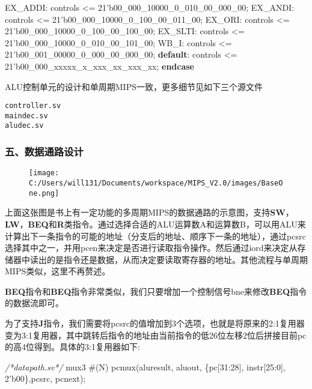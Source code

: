 \documentclass[]{article}
\newenvironment{Shaded}{}{}
\newcommand{\KeywordTok}[1]{\textcolor[rgb]{0.00,0.44,0.13}{\textbf{#1}}}
\newcommand{\DecValTok}[1]{\textcolor[rgb]{0.25,0.63,0.44}{#1}}
\newcommand{\BaseNTok}[1]{\textcolor[rgb]{0.25,0.63,0.44}{#1}}
\newcommand{\CommentTok}[1]{\textcolor[rgb]{0.38,0.63,0.69}{\textit{#1}}}
\newcommand{\NormalTok}[1]{#1}
\begin{document}
\begin{Shaded}
\begin{Highlighting}[]
            \DecValTok{EX_ADDI:}\NormalTok{    controls <= }\BaseNTok{21'b00_000_10000_0_010_00_000_00}\NormalTok{;}
            \DecValTok{EX_ANDI:}\NormalTok{    controls <= }\BaseNTok{21'b00_000_10000_0_100_00_011_00}\NormalTok{; }
            \DecValTok{EX_ORI:}\NormalTok{     controls <= }\BaseNTok{21'b00_000_10000_0_100_00_100_00}\NormalTok{; }
            \DecValTok{EX_SLTI:}\NormalTok{    controls <= }\BaseNTok{21'b00_000_10000_0_010_00_101_00}\NormalTok{; }
            \DecValTok{WB_I:}\NormalTok{       controls <= }\BaseNTok{21'b00_001_00000_0_000_00_000_00}\NormalTok{;}
            \KeywordTok{default}\NormalTok{:    controls <= }\BaseNTok{21'b00_000_xxxxx_x_xxx_xx_xxx_xx}\NormalTok{;}
        \KeywordTok{endcase}
\end{Highlighting}
\end{Shaded}

ALU控制单元的设计和单周期MIPS一致，更多细节见如下三个源文件

\begin{verbatim}
controller.sv 
maindec.sv
aludec.sv
\end{verbatim}

\subsubsection{五、数据通路设计}\label{header-n1972}

\begin{figure}
\centering
\texttt{[image: C:/Users/will131/Documents/workspace/MIPS\_V2.0/images/BaseOne.png]}
\caption{}
\end{figure}

上面这张图是书上有一定功能的多周期MIPS的数据通路的示意图，支持\textbf{SW}，\textbf{LW}，\textbf{BEQ}和\textbf{R}类指令。通过选择合适的ALU运算数A和运算数B，可以用ALU来计算出下一条指令的可能的地址（分支后的地址、顺序下一条的地址），通过pcsrc选择其中之一，并用pcen来决定是否进行读取指令操作。然后通过iord来决定从存储器中读出的是指令还是数据，从而决定要读取寄存器的地址。其他流程与单周期MIPS类似，这里不再赘述。

\textbf{BEQ}指令和\textbf{BEQ}指令非常类似，我们只要增加一个控制信号bne来修改\textbf{BEQ}指令的数据流即可。

为了支持\textbf{J}指令，我们需要将pcsrc的值增加到3个选项，也就是将原来的2:1复用器变为3:1复用器，其中跳转后指令的地址由当前指令的低26位左移2位后拼接目前pc的高4位得到。具体的3:1复用器如下:

\begin{Shaded}
\begin{Highlighting}[]
\CommentTok{/*datapath.sv*/}
\NormalTok{mux3 #(N)       pcmux(aluresult, aluout, \{pc[}\DecValTok{31}\NormalTok{:}\DecValTok{28}\NormalTok{], instr[}\DecValTok{25}\NormalTok{:}\DecValTok{0}\NormalTok{], }\BaseNTok{2'b00}\NormalTok{\},pcsrc, pcnext);}
\end{Highlighting}
\end{Shaded}
\end{document}
